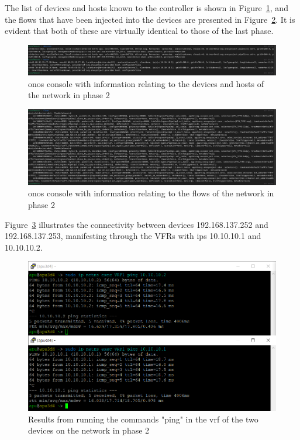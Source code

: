 The list of devices and hosts known to the controller is shown in Figure~\ref{fig:exp2_phase2_onos}, and the flows that have been injected into the devices are presented in Figure~\ref{fig:exp2_phase2_onos_flows}. It is evident that both of these are virtually identical to those of the last phase.

\begin{figure}
	\centering
	\includegraphics[width=\textwidth]{Chapters/Figures/tests/bmv2_phase_2/onos_topology.PNG}
	\caption{\gls{onos} console with information relating to the devices and hosts of the network in phase 2}
	\label{fig:exp2_phase2_onos}
\end{figure}

\begin{figure}
	\centering
	\includegraphics[width=\textwidth]{Chapters/Figures/tests/bmv2_phase_2/onos_flows.PNG}
	\caption{\gls{onos} console with information relating to the flows of the network in phase 2}
	\label{fig:exp2_phase2_onos_flows}
\end{figure}

Figure~\ref{fig:exp2_phase2_pings} illustrates the connectivity between devices 192.168.137.252 and 192.168.137.253, manifesting through the VFRs with \glspl{ip} 10.10.10.1 and 10.10.10.2.

\begin{figure}
	\centering
	\includegraphics[width=\textwidth]{Chapters/Figures/tests/bmv2_phase_2/pings.PNG}
	\caption{Results from running the commands "ping" in the \gls{vrf} of the two devices on the network in phase 2}
	\label{fig:exp2_phase2_pings}
\end{figure}

